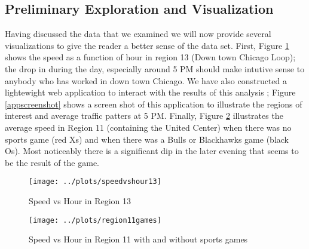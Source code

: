 \documentclass[12pt]{article}
\begin{document}
\subsection{Preliminary Exploration and Visualization}
Having discussed the data that we examined we will now provide several visualizations to give the reader a better sense of the data set. First, Figure \ref{speedvshour13} shows the speed as a function of hour in region 13 (Down town Chicago Loop); the drop in during the day, especially around 5 PM should make intutive sense to anybody who has worked in down town Chicago. We have also constructed a lightewight web application to interact with the results of this analysis \cite{trafficapp}; Figure \ref{appscreenshot} shows a screen shot of this application to illustrate the regions of interest and average traffic patters at 5 PM. Finally, Figure \ref{region11games} illustrates the average speed in Region 11 (containing the United Center) when there was no sports game (red Xs) and when there was a Bulls or Blackhawks game (black Os). Most noticeably there is a significant dip in the later evening that seems to be the result of the game.
\begin{figure}[ht!]
\texttt{[image: ../plots/speedvshour13]}
\caption{Speed vs Hour in Region 13}
\label{speedvshour13}
\end{figure}
\begin{figure}[ht!]
\texttt{[image: ../plots/region11games]}
\caption{Speed vs Hour in Region 11 with and without sports games}
\label{region11games}
\end{figure}
\end{document}
